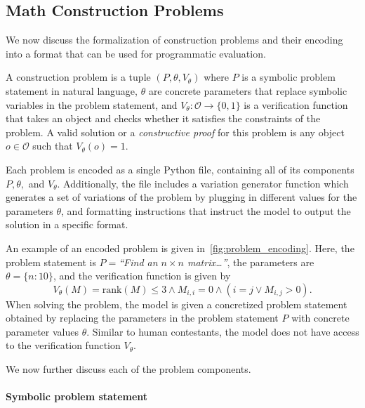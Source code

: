 \subsection{Math Construction Problems} \label{sec:benchmark:encoding}

We now discuss the formalization of construction problems and their encoding into a format that can be used for programmatic evaluation.

\begin{definition}
    A construction problem is a tuple $(P, \theta, V_\theta)$ where $P$ is a symbolic problem statement in natural language, $\theta$ are concrete parameters that replace symbolic variables in the problem statement, and $V_\theta\colon \mathcal{O} \to \{0, 1\}$ is a verification function that takes an object and checks whether it satisfies the constraints of the problem.
    A valid solution or a \emph{constructive proof} for this problem is any object $o \in \mathcal{O}$ such that $V_\theta(o) = 1$.
\end{definition}

Each problem is encoded as a single Python file, containing all of its components $P, \theta,$ and $V_\theta$. Additionally, the file includes a variation generator function which generates a set of variations of the problem by plugging in different values for the parameters $\theta$, and formatting instructions that instruct the model to output the solution in a specific format.

An example of an encoded \mc{} problem is given in~\cref{fig:problem_encoding}.
Here, the problem statement is $P=$\emph{``Find an $n \times n$ matrix\ldots''}, the parameters are $\theta = \{n\colon 10\}$, and the verification function is given by
\begin{equation*}
V_\theta(M) = \text{rank}(M) \leq 3 \land M_{i,i} = 0 \land (i = j \lor M_{i,j} > 0).
\end{equation*}
When solving the problem, the model is given a concretized problem statement obtained by replacing the parameters in the problem statement $P$ with concrete parameter values $\theta$. 
Similar to human contestants, the model does not have access to the verification function $V_\theta$.

We now further discuss each of the problem components.

\paragraph{Symbolic problem statement}

